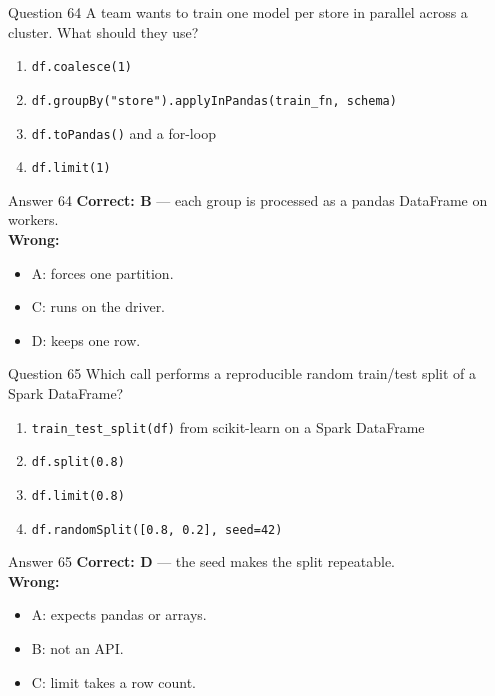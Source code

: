 \documentclass[aspectratio=169,11pt]{beamer}
\begin{document}
	\begin{frame}{Question 64}
		A team wants to train one model per store in parallel across a cluster. What should they use?
		\begin{enumerate}[label=\Alph*.]
			\item \texttt{df.coalesce(1)}
			\item \texttt{df.groupBy("store").applyInPandas(train\_fn, schema)}
			\item \texttt{df.toPandas()} and a for-loop
			\item \texttt{df.limit(1)}
		\end{enumerate}
	\end{frame}
	\begin{frame}{Answer 64}
		\textbf{Correct: B} --- each group is processed as a pandas DataFrame on workers.\\
		\vspace{0.5em}
		\textbf{Wrong:}
		\begin{itemize}
			\item A: forces one partition.
			\item C: runs on the driver.
			\item D: keeps one row.
		\end{itemize}
	\end{frame}
	
	\begin{frame}{Question 65}
		Which call performs a reproducible random train/test split of a Spark DataFrame?
		\begin{enumerate}[label=\Alph*.]
			\item \texttt{train\_test\_split(df)} from scikit-learn on a Spark DataFrame
			\item \texttt{df.split(0.8)}
			\item \texttt{df.limit(0.8)}
			\item \texttt{df.randomSplit([0.8, 0.2], seed=42)}
		\end{enumerate}
	\end{frame}
	\begin{frame}{Answer 65}
		\textbf{Correct: D} --- the seed makes the split repeatable.\\
		\vspace{0.5em}
		\textbf{Wrong:}
		\begin{itemize}
			\item A: expects pandas or arrays.
			\item B: not an API.
			\item C: limit takes a row count.
		\end{itemize}
	\end{frame}
	
\end{document}
